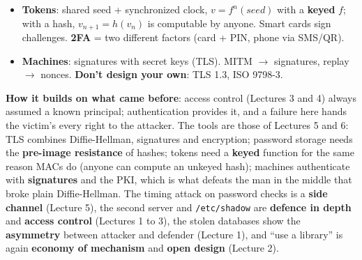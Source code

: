 \begin{recapbox}[title={Exam-ready recap --- Lecture 7: Authentication}]
\begin{itemize}
        $\to$ template $\to$ store) then verification (compare). Local storage = privacy, remote =
        easy to secure/update. Inexact match $\Rightarrow$ threshold: fewer false negatives =
        more false positives (bank vs.\ gym). Problems: not secret (liveness detection), cannot be
        revoked, link people across systems, reveal health, change over time.
  \item \textbf{Tokens}: shared seed + synchronized clock, $v = f^n(\mathit{seed})$ with a
        \textbf{keyed} $f$; with a hash, $v_{n+1} = h(v_n)$ is computable by anyone. Smart
        cards sign challenges. \textbf{2FA} = two different factors (card + PIN, phone via SMS/QR).
  \item \textbf{Machines}: signatures with secret keys (TLS). MITM $\to$ signatures, replay $\to$
        nonces. \textbf{Don't design your own}: TLS 1.3, ISO 9798-3.
\end{itemize}
\textbf{How it builds on what came before}: access control (Lectures 3 and 4) always assumed a
known principal; authentication provides it, and a failure here hands the victim's every right to
the attacker. The tools are those of Lectures 5 and 6: TLS combines Diffie-Hellman, signatures and
encryption; password storage needs the \textbf{pre-image resistance} of hashes; tokens need a
\textbf{keyed} function for the same reason MACs do (anyone can compute an unkeyed hash); machines
authenticate with \textbf{signatures} and the PKI, which is what defeats the man in the middle that
broke plain Diffie-Hellman. The timing attack on password checks is a \textbf{side channel}
(Lecture 5), the second server and \texttt{/etc/shadow} are \textbf{defence in depth} and
\textbf{access control} (Lectures 1 to 3), the stolen databases show the \textbf{asymmetry}
between attacker and defender (Lecture 1), and ``use a library'' is again \textbf{economy of
mechanism} and \textbf{open design} (Lecture 2).
\end{recapbox}
